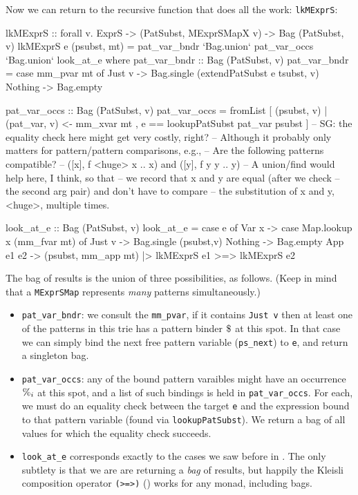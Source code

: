 \documentclass[acmsmall]{acmart}
\theoremstyle{theorem}
\theoremstyle{definition}
\theoremstyle{remark}
\begin{document}
Now we can return to the recursive function that does all the work: \lstinline{lkMExprS}:
\begin{code}
lkMExprS :: forall v. ExprS -> (PatSubst, MExprSMapX v) -> Bag (PatSubst, v)
lkMExprS e (psubst, mt)
  = pat_var_bndr `Bag.union` pat_var_occs `Bag.union` look_at_e
  where
     pat_var_bndr :: Bag (PatSubst, v)
     pat_var_bndr = case mm_pvar mt of
                      Just v  -> Bag.single (extendPatSubst e tsubst, v)
                      Nothing -> Bag.empty

     pat_var_occs :: Bag (PatSubst, v)
     pat_var_occs = fromList [ (psubst, v)
                             | (pat_var, v) <- mm_xvar mt
                             , e == lookupPatSubst pat_var psubst ]
                             -- SG: the equality check here might get very costly, right?
                             -- Although it probably only matters for pattern/pattern comparisons, e.g.,
                             -- Are the following patterns compatible?
                             --   ([x], f <huge> x .. x) and ([y], f y y .. y)
                             -- A union/find would help here, I think, so that
                             -- we record that x and y are equal (after we check
                             -- the second arg pair) and don't have to compare
                             -- the substitution of x and y, <huge>, multiple times.

     look_at_e :: Bag (PatSubst, v)
     look_at_e = case e of
        Var x     -> case Map.lookup x (mm_fvar mt) of
                       Just v  -> Bag.single (psubst,v)
                       Nothing -> Bag.empty
        App e1 e2 -> (psubst, mm_app mt) |> lkMExprS e1 >=> lkMExprS e2
\end{code}
The bag of results is the union of three possibilities, as follows. (Keep in mind that a \lstinline{MExprSMap} represents \emph{many} patterns simultaneously.)
\begin{itemize}
\item \lstinline{pat_var_bndr}: we consult the \lstinline{mm_pvar}, if it contains \lstinline{Just v} then at least one of the patterns in this trie has a pattern binder $\$_{}$ at this spot.  In that case we can simply bind the next free pattern variable (\lstinline{ps_next}) to \lstinline{e}, and return a singleton bag.
\item \lstinline{pat_var_occs}: any of the bound pattern varaibles might have an occurrence $\%_{i}$ at this spot, and a list of such bindings is held in \lstinline{pat_var_occs}.  For each, we must do an equality check between the target \lstinline{e} and the expression bound to that pattern variable (found via \lstinline{lookupPatSubst}).  We return a bag of all values for which the equality check succeeds.
  \item \lstinline{look_at_e} corresponds exactly to the cases we saw before in .   The only subtlety is that we are are returning a \emph{bag} of results, but happily the Kleisli composition operator \lstinline{(>=>)} () works for any monad, including bags.
\end{itemize}
\end{document}
